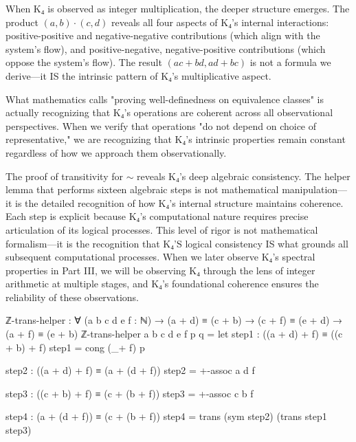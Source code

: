 \documentclass[11pt,a4paper]{book}
\begin{document}
When K₄ is observed as integer multiplication, the deeper structure emerges. The product $(a,b) \cdot (c,d)$ reveals all four aspects of K₄'s internal interactions: positive-positive and negative-negative contributions (which align with the system's flow), and positive-negative, negative-positive contributions (which oppose the system's flow). The result $(ac + bd, ad + bc)$ is not a formula we derive—it IS the intrinsic pattern of K₄'s multiplicative aspect.

What mathematics calls "proving well-definedness on equivalence classes" is actually recognizing that K₄'s operations are coherent across all observational perspectives. When we verify that operations "do not depend on choice of representative," we are recognizing that K₄'s intrinsic properties remain constant regardless of how we approach them observationally.

The proof of transitivity for $\sim$ reveals K₄'s deep algebraic consistency. The helper lemma that performs sixteen algebraic steps is not mathematical manipulation—it is the detailed recognition of how K₄'s internal structure maintains coherence. Each step is explicit because K₄'s computational nature requires precise articulation of its logical processes. This level of rigor is not mathematical formalism—it is the recognition that K₄'S logical consistency IS what grounds all subsequent computational processes. When we later observe K₄'s spectral properties in Part III, we will be observing K₄ through the lens of integer arithmetic at multiple stages, and K₄'s foundational coherence ensures the reliability of these observations.

\begin{code}
ℤ-trans-helper : ∀ (a b c d e f : ℕ)
               → (a + d) ≡ (c + b)
               → (c + f) ≡ (e + d)
               → (a + f) ≡ (e + b)
ℤ-trans-helper a b c d e f p q =
  let
    step1 : ((a + d) + f) ≡ ((c + b) + f)
    step1 = cong (_+ f) p
    
    step2 : ((a + d) + f) ≡ (a + (d + f))
    step2 = +-assoc a d f
    
    step3 : ((c + b) + f) ≡ (c + (b + f))
    step3 = +-assoc c b f
    
    step4 : (a + (d + f)) ≡ (c + (b + f))
    step4 = trans (sym step2) (trans step1 step3)
    
\end{code}
\end{document}
